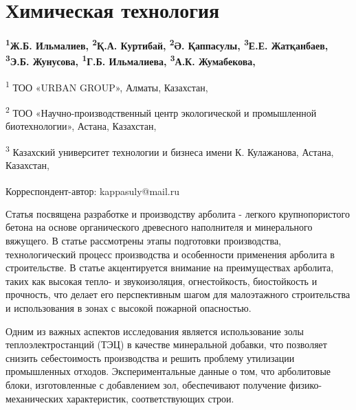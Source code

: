 \let\cleardoublepage\clearpage
\chapter{Химическая технология}

\begin{articleheader}

{\bfseries
\textsuperscript{1}Ж.Б. Ильмалиев,
\textsuperscript{2}Қ.А. Куртибай,
\textsuperscript{2}Ә. Қаппасулы\textsuperscript{\envelope },
\textsuperscript{3}Е.Е. Жатқанбаев,
\textsuperscript{3}Э.Б. Жунусова,
\textsuperscript{1}Г.Б. Ильмалиева,
\textsuperscript{3}А.К. Жумабекова,
}
\end{articleheader}

\begin{affiliation}
\textsuperscript{1} ТОО «URBAN GROUP», Алматы, Казахстан,

\textsuperscript{2} ТОО «Научно-производственный центр экологической и промышленной биотехнологии», Астана, Казахстан,

\textsuperscript{3} Казахский университет технологии и бизнеса имени К. Кулажанова, Астана, Казахстан,

\raggedright \textsuperscript{\envelope } Корреспондент-автор: kappasuly@mail.ru
\end{affiliation}

Статья посвящена разработке и производству арболита - легкого
крупнопористого бетона на основе органического древесного наполнителя и
минерального вяжущего. В статье рассмотрены этапы подготовки
производства, технологический процесс производства и особенности
применения арболита в строительстве. В статье акцентируется внимание на
преимуществах арболита, таких как высокая тепло- и звукоизоляция,
огнестойкость, биостойкость и прочность, что делает его перспективным
шагом для малоэтажного строительства и использования в зонах с высокой
пожарной опасностью.

Одним из важных аспектов исследования является использование золы
теплоэлектростанций (ТЭЦ) в качестве минеральной добавки, что позволяет
снизить себестоимость производства и решить проблему утилизации
промышленных отходов. Экспериментальные данные о том, что арболитовые
блоки, изготовленные с добавлением зол, обеспечивают получение
физико-механических характеристик, соответствующих строи.

